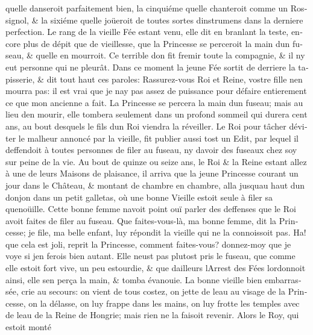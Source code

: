 \documentclass[14pt,a4paper]{memoir}
\begin{document}
\begin{otherlanguage}{french}
qu\textquotesingle elle danseroit parfaitement bien, la cinquiéme
qu\textquotesingle elle chanteroit comme un Rossignol, \& la sixiéme
qu\textquotesingle elle joüeroit de toutes sortes
d\textquotesingle instrumens dans la derniere perfection. Le rang de la
vieille Fée estant venu, elle dit en branlant la teste, encore plus de
dépit que de vieillesse, que la Princesse se perceroit la main
d\textquotesingle un fuseau, \& qu\textquotesingle elle en mourroit. Ce
terrible don fit fremir toute la compagnie, \& il n\textquotesingle y
eut personne qui ne pleurât. Dans ce moment la jeune Fée sortit de
derriere la tapisserie, \& dit tout haut ces paroles: Rassurez-vous Roi
et Reine, vostre fille n\textquotesingle en mourra pas: il est vrai que
je n\textquotesingle ay pas assez de puissance pour défaire entierement
ce que mon ancienne a fait. La Princesse se percera la main
d\textquotesingle un fuseau; mais au lieu d\textquotesingle en mourir,
elle tombera seulement dans un profond sommeil qui durera cent ans, au
bout desquels le fils d\textquotesingle un Roi viendra la réveiller. Le
Roi pour tâcher d\textquotesingle éviter le malheur annoncé par la
vieille, fit publier aussi tost un Edit, par lequel il deffendoit à
toutes personnes de filer au fuseau, ny d\textquotesingle avoir des
fuseaux chez soy sur peine de la vie. Au bout de quinze ou seize ans, le
Roi \& la Reine estant allez à une de leurs Maisons de plaisance, il
arriva que la jeune Princesse courant un jour dans le Château, \&
montant de chambre en chambre, alla jusqu\textquotesingle au haut
d\textquotesingle un donjon dans un petit galletas, où une bonne Vieille
estoit seule à filer sa quenoüille. Cette bonne femme
n\textquotesingle avoit point ouï parler des deffenses que le Roi avoit
faites de filer au fuseau. Que faites-vous-là, ma bonne femme, dit la
Princesse; je file, ma belle enfant, luy répondit la vieille qui ne la
connoissoit pas. Ha! que cela est joli, reprit la Princesse, comment
faites-vous? donnez-moy que je voye si j\textquotesingle en ferois bien
autant. Elle n\textquotesingle eust pas plutost pris le fuseau, que
comme elle estoit fort vive, un peu estourdie, \& que
d\textquotesingle ailleurs l\textquotesingle Arrest des Fées
l\textquotesingle ordonnoit ainsi, elle s\textquotesingle en perça la
main, \& tomba évanouie. La bonne vieille bien embarrassée, crie au
secours: on vient de tous costez, on jette de l\textquotesingle eau au
visage de la Princesse, on la délasse, on luy frappe dans les mains, on
luy frotte les temples avec de l\textquotesingle eau de la Reine de
Hongrie; mais rien ne la faisoit revenir. Alors le Roy, qui estoit monté

\end{otherlanguage}
\end{document}
